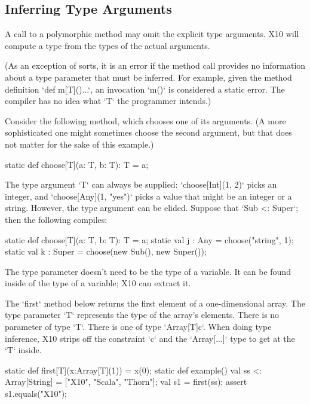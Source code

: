 \subsection{Inferring Type Arguments}
\label{TypeParamInfer}


A call to a polymorphic method %
may omit the
explicit type arguments.  
X10 will compute a type from the types of the actual arguments. 

(As an exception of sorts, it is an error if the method call provides no information about
a type parameter that must be inferred.  For example, given the method
definition \xcd`def m[T](){...}`, an invocation \xcd`m()` is considered a
static error.  The compiler has no idea what \xcd`T` the programmer intends.)



\begin{ex}Consider the following method, which chooses one of its arguments.  (A more
sophisticated one might sometimes choose the second argument, but that does
not matter for the sake of this example.)
\begin{xten}
static def choose[T](a: T, b: T): T = a; 
\end{xten}


The type argument \xcd`T` can always be supplied: 
\xcd`choose[Int](1, 2)` picks an integer, 
and \xcd`choose[Any](1, "yes")` picks a value that might be an integer or a
string.  
However, the type argument can be elided.  Suppose that \xcd`Sub <: Super`;
then the following compiles: 

\begin{xten}
  static def choose[T](a: T, b: T): T = a; 
  static val j : Any = choose("string", 1);
  static val k : Super = choose(new Sub(), new Super());
\end{xten}
\end{ex}

The type parameter doesn't need to be the type of a variable. It can be found
inside of the type of a variable; X10 can extract it.

\begin{ex}
The \xcd`first` method below returns the first element of a one-dimensional
array.  The type parameter \xcd`T` represents the type of the array's
elements. There is no parameter of type \xcd`T`. There is one of type
\xcd`Array[T]{c}`.  When doing type inference, 
X10 strips off the constraint \xcd`{c}` and the
\xcd`Array[...]` type to get at the \xcd`T` inside.
\begin{xten}
static def first[T](x:Array[T](1)) = x(0);
static def example() {
  val ss <: Array[String] = ["X10", "Scala", "Thorn"];
  val s1 = first(ss);
  assert s1.equals("X10");
}
\end{xten}

\end{ex}


